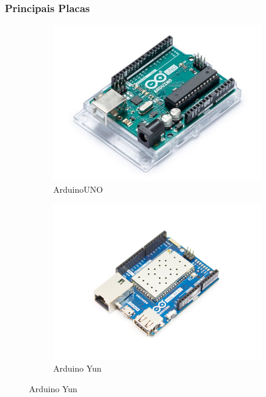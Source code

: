 \documentclass{beamer}
\begin{document}
\begin{frame}
\frametitle{Principais Placas}
\begin{minipage}{\textwidth}
	
	\begin{figure}
		\centering
		\begin{subfigure}[b]{0.25\textwidth}
			\includegraphics[width=\textwidth]{arduinoUNO.jpg}
			\caption{ArduinoUNO}
			\label{fig:arudinddfo_uno}
		\end{subfigure}
		\begin{subfigure}[b]{0.25\textwidth}
			\includegraphics[width=\textwidth]{arduino_yun.png}
			\caption{Arduino Yun}
			\label{fig:node_mcudfd}
		\end{subfigure}

\end{figure}
\end{minipage}
\end{frame}
\end{document}
